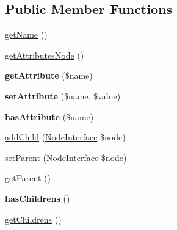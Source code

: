 \subsection*{Public Member Functions}
\begin{DoxyCompactItemize}
\item 
\mbox{\hyperlink{class_pes_1_1_dom_1_1_node_1_1_node_abstract_a3d0963e68bb313b163a73f2803c64600}{get\+Name}} ()
\item 
\mbox{\hyperlink{class_pes_1_1_dom_1_1_node_1_1_node_abstract_a4722e7722b245351681b05d35f6694f3}{get\+Attributes\+Node}} ()
\item 
\mbox{\label{class_pes_1_1_dom_1_1_node_1_1_node_abstract_ae954da422d40fc286691e54679e44c6f}} 
{\bfseries get\+Attribute} (\$name)
\item 
\mbox{\label{class_pes_1_1_dom_1_1_node_1_1_node_abstract_a545f43e4d937e0e272a4bafe8b411d55}} 
{\bfseries set\+Attribute} (\$name, \$value)
\item 
\mbox{\label{class_pes_1_1_dom_1_1_node_1_1_node_abstract_ac78ba27a41d0291c61326022489d4986}} 
{\bfseries has\+Attribute} (\$name)
\item 
\mbox{\hyperlink{class_pes_1_1_dom_1_1_node_1_1_node_abstract_a1d59c3782ba90a94f31ee6c58d86e9fc}{add\+Child}} (\mbox{\hyperlink{interface_pes_1_1_dom_1_1_node_1_1_node_interface}{Node\+Interface}} \$node)
\item 
\mbox{\hyperlink{class_pes_1_1_dom_1_1_node_1_1_node_abstract_a3eb7b224ac469e505363e30fd18d3dbb}{set\+Parent}} (\mbox{\hyperlink{interface_pes_1_1_dom_1_1_node_1_1_node_interface}{Node\+Interface}} \$node)
\item 
\mbox{\hyperlink{class_pes_1_1_dom_1_1_node_1_1_node_abstract_a95ecaee3537b1ad29b04ef383a57bbae}{get\+Parent}} ()
\item 
\mbox{\label{class_pes_1_1_dom_1_1_node_1_1_node_abstract_aba4a4ebb19df879bd02542b85a83bd2f}} 
{\bfseries has\+Childrens} ()
\item 
\mbox{\hyperlink{class_pes_1_1_dom_1_1_node_1_1_node_abstract_a97634dc0a1d163eb272a73543accaa92}{get\+Childrens}} ()
\end{DoxyCompactItemize}
